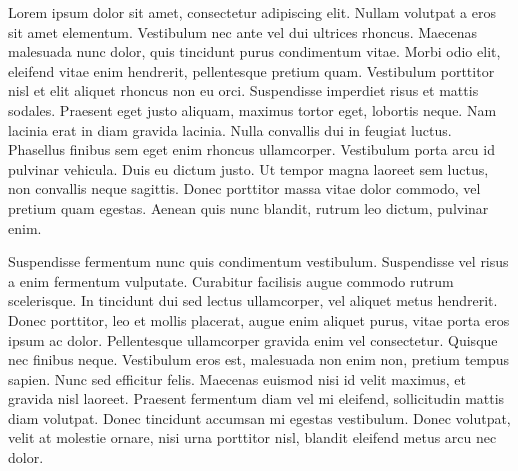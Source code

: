 \newpage
\AddToShipoutPicture*{\BackgroundPicLast}

\color{white}
Lorem ipsum dolor sit amet, consectetur adipiscing elit. Nullam volutpat a eros sit amet elementum. Vestibulum nec ante vel dui ultrices rhoncus. Maecenas malesuada nunc dolor, quis tincidunt purus condimentum vitae. Morbi odio elit, eleifend vitae enim hendrerit, pellentesque pretium quam. Vestibulum porttitor nisl et elit aliquet rhoncus non eu orci. Suspendisse imperdiet risus et mattis sodales. Praesent eget justo aliquam, maximus tortor eget, lobortis neque. Nam lacinia erat in diam gravida lacinia. Nulla convallis dui in feugiat luctus. Phasellus finibus sem eget enim rhoncus ullamcorper. Vestibulum porta arcu id pulvinar vehicula. Duis eu dictum justo. Ut tempor magna laoreet sem luctus, non convallis neque sagittis. Donec porttitor massa vitae dolor commodo, vel pretium quam egestas. Aenean quis nunc blandit, rutrum leo dictum, pulvinar enim.

Suspendisse fermentum nunc quis condimentum vestibulum. Suspendisse vel risus a enim fermentum vulputate. Curabitur facilisis augue commodo rutrum scelerisque. In tincidunt dui sed lectus ullamcorper, vel aliquet metus hendrerit. Donec porttitor, leo et mollis placerat, augue enim aliquet purus, vitae porta eros ipsum ac dolor. Pellentesque ullamcorper gravida enim vel consectetur. Quisque nec finibus neque. Vestibulum eros est, malesuada non enim non, pretium tempus sapien. Nunc sed efficitur felis. Maecenas euismod nisi id velit maximus, et gravida nisl laoreet. Praesent fermentum diam vel mi eleifend, sollicitudin mattis diam volutpat. Donec tincidunt accumsan mi egestas vestibulum. Donec volutpat, velit at molestie ornare, nisi urna porttitor nisl, blandit eleifend metus arcu nec dolor. 

